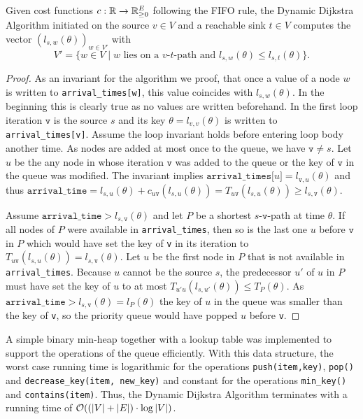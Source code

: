 \begin{proposition}
    Given cost functions $c:\mathbb{R} \rightarrow \mathbb{R}_{\geq0}^E$ following the FIFO rule, the Dynamic Dijkstra Algorithm initiated on the source $v\in V$ and a reachable sink $t\in V$ computes the vector $(l_{s,w}(\theta))_{w\in V'}$ with \[
        V' = \{ w\in V \mid \text{$w$ lies on a $v$-$t$-path and $l_{s,w}(\theta) \leq l_{s,t}(\theta)$} \}.
    \]
\end{proposition}
\begin{proof}
    As an invariant for the algorithm we proof, that once a value of a node $w$ is written to \texttt{arrival\_times[w]}, this value coincides with $l_{s,w}(\theta)$.
    In the beginning this is clearly true as no values are written beforehand.
    In the first loop iteration $\texttt{v}$ is the source $s$ and its key $\theta= l_{v,v}(\theta)$ is written to \texttt{arrival\_times[v]}.
    Assume the loop invariant holds before entering loop body another time.
    As nodes are added at most once to the queue, we have $\texttt{v} \neq s$.
    Let $u$ be the any node in whose iteration $\texttt{v}$ was added to the queue or the key of $\texttt{v}$ in the queue was modified.
    The invariant implies $\texttt{arrival\_times[}u\texttt{]} = l_{\texttt{v},u}(\theta)$ and thus $\texttt{arrival\_time} = l_{s,u}(\theta) + c_{u\texttt{v}}(l_{s,u}(\theta)) = T_{u\texttt{v}}(l_{s,u}(\theta)) \geq l_{s,\texttt{v}}(\theta)$.

    Assume $\texttt{arrival\_time} > l_{s,\texttt{v}}(\theta)$ and let $P$ be a shortest $s$-$\texttt{v}$-path at time $\theta$.
    If all nodes of $P$ were available in \texttt{arrival\_times}, then so is the last one $u$ before $\texttt{v}$ in $P$ which would have set the key of \texttt{v} in its iteration to $T_{u\texttt{v}}(l_{s,u}(\theta)) = l_{s,\texttt{v}}(\theta)$.
    Let $u$ be the first node in $P$ that is not available in \texttt{arrival\_times}.
    Because $u$ cannot be the source $s$, the  predecessor $u'$ of $u$ in $P$ must have set the key of $u$ to at most $T_{u'u}(l_{s,u'}(\theta)) \leq T_P(\theta)$.
    As $\texttt{arrival\_time}>l_{s,\texttt{v}}(\theta) = l_P(\theta)$ the key of $u$ in the queue was smaller than the key of \texttt{v}, so the priority queue would have popped $u$ before \texttt{v}.
\end{proof}

A simple binary min-heap together with a lookup table was implemented to support the operations of the queue efficiently.
With this data structure, the worst case running time is logarithmic for the operations \texttt{push(item,key)}, \texttt{pop()} and \texttt{decrease\_key(item, new\_key)} and constant for the operations \texttt{min\_key()} and \texttt{contains(item)}.
Thus, the Dynamic Dijkstra Algorithm terminates with a running time of $\mathcal{O}( (\left| V \right| + \left| E \right|) \cdot \log \left| V \right|)$.


